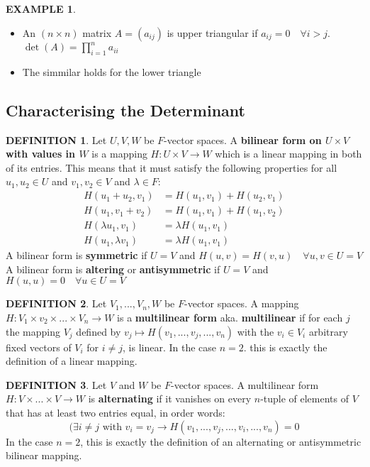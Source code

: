 \documentclass[12pt]{article}
\theoremstyle{definition}
\newtheorem{definition}{DEFINITION}[subsection]
\newtheorem{example}{EXAMPLE}[subsection]
\begin{document}
\begin{example}
    \quad
    \begin{itemize}
        \item An $(n \times n)$ matrix $A = (a_{ij})$ is upper triangular if $a_{ij} = 0 \quad \forall i > j$. $\det(A) = \prod_{i=1}^n a_{ii}$
        \item The simmilar holds for the lower triangle
    \end{itemize}
\end{example}


\subsection{Characterising the Determinant}
\begin{definition}
    Let $U,V,W$ be $F$-vector spaces. A \textbf{bilinear form on $U \times V$ with values in $W$} is a mapping $H:U \times V \rightarrow W$ which is a linear mapping in both of its entries. This means that it must satisfy the following properties for all $u_1, u_2 \in U$ and $v_1, v_2 \in V $ and $\lambda \in F$:
    \[\begin{split}
        H(u_1 + u_2, v_1) &= H(u_1, v_1) + H(u_2, v_1)\\
        H(u_1, v_1 + v_2) &= H(u_1, v_1) + H(u_1, v_2)\\
        H(\lambda u_1, v_1) &= \lambda H(u_1, v_1)\\
        H(u_1,\lambda v_1) &= \lambda H(u_1, v_1)
    \end{split}\]
    A bilinear form is \textbf{symmetric} if $U = V$ and $H(u,v) = H(v,u) \quad \forall u,v \in U =V$\\
    A bilinear form is \textbf{altering} or \textbf{antisymmetric} if $U = V$ and $H(u,u) = 0 \quad \forall u \in U =V$
\end{definition}

\begin{definition}
    Let $V_1, ..., V_n, W$ be $F$-vector spaces. A mapping $H:V_1\times v_2\times ... \times V_n \rightarrow W$ is a \textbf{multilinear form} aka. \textbf{multilinear} if for each $j$ the mapping $V_j$ defined by $v_j \mapsto H(v_1,...,v_j,...,v_n)$ with the $v_i\in V_i$ arbitrary fixed vectors of $V_i$ for $i \neq j$, is linear. In the case $n = 2$. this is exactly the definition of a linear mapping.
\end{definition}

\begin{definition}
    Let $V$ and $W$ be $F$-vector spaces. A multilinear form $H:V\times ... \times V \rightarrow W$ is \textbf{alternating} if it vanishes on every $n$-tuple of elements of $V$ that has at least two entries equal, in order words:
    $$(\exists i \neq j \text{ with } v_i = v_j \rightarrow H(v_1,...,v_j,...,v_i,...,v_n) = 0$$
    In the case $n = 2$, this is exactly the definition of an alternating or antisymmetric bilinear mapping.
\end{definition}
\end{document}
